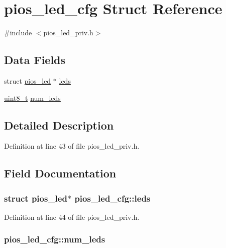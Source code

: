 \hypertarget{structpios__led__cfg}{\section{pios\-\_\-led\-\_\-cfg Struct Reference}
\label{structpios__led__cfg}
}


{\ttfamily \#include $<$pios\-\_\-led\-\_\-priv.\-h$>$}

\subsection*{Data Fields}
\begin{DoxyCompactItemize}
\item 
struct \hyperlink{structpios__led}{pios\-\_\-led} $\ast$ \hyperlink{structpios__led__cfg_a72aa7a241b8cc809461b9b9196cf3da0}{leds}
\item 
\hyperlink{stdint_8h_aba7bc1797add20fe3efdf37ced1182c5}{uint8\-\_\-t} \hyperlink{structpios__led__cfg_a66071a8b465de9adeeb0c20ac329f21c}{num\-\_\-leds}
\end{DoxyCompactItemize}


\subsection{Detailed Description}


Definition at line 43 of file pios\-\_\-led\-\_\-priv.\-h.



\subsection{Field Documentation}
\hypertarget{structpios__led__cfg_a72aa7a241b8cc809461b9b9196cf3da0}{
\subsubsection[{leds}]{\setlength{\rightskip}{0pt plus 5cm}struct {\bf pios\-\_\-led}$\ast$ pios\-\_\-led\-\_\-cfg\-::leds}}\label{structpios__led__cfg_a72aa7a241b8cc809461b9b9196cf3da0}


Definition at line 44 of file pios\-\_\-led\-\_\-priv.\-h.

\hypertarget{structpios__led__cfg_a66071a8b465de9adeeb0c20ac329f21c}{
\subsubsection[{num\-\_\-leds}]{ pios\-\_\-led\-\_\-cfg\-::num\-\_\-leds}}\label{structpios__led__cfg_a66071a8b465de9adeeb0c20ac329f21c}


